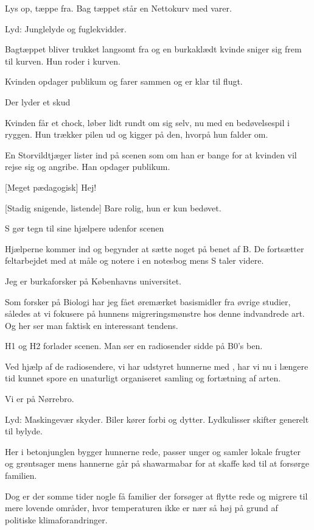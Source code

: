 \documentclass[a4paper,11pt]{article}
\begin{document}
  
\begin{sketch}
\scene Lys op, tæppe fra. Bag tæppet står en Nettokurv med varer.

\scene Lyd: Junglelyde og fuglekvidder.

\scene Bagtæppet bliver trukket langsomt fra og en burkaklædt kvinde sniger sig frem til kurven. Hun roder i kurven.

\scene Kvinden opdager publikum og farer sammen og er klar til flugt.

\scene Der lyder et skud

\scene Kvinden får et chock, løber lidt rundt om sig selv, nu med en bedøvelsespil i ryggen. Hun trækker pilen ud og kigger på den, hvorpå hun falder om.

\scene En Storvildtjæger lister ind på scenen som om han er bange for at kvinden vil rejse sig og angribe. Han opdager publikum.

[Meget pædagogisk] Hej! 

[Stadig snigende, listende] Bare rolig, hun er kun bedøvet. 

\scene S gør tegn til sine hjælpere udenfor scenen

\scene Hjælperne kommer ind og begynder at sætte noget på benet af B. De fortsætter feltarbejdet med at måle og notere i en notesbog mens S taler videre.

 Jeg er burkaforsker på Københavns universitet. 

 Som forsker på Biologi har jeg fået øremærket basismidler fra  øvrige studier, således at vi fokusere på hunnens migreringsmønstre hos denne indvandrede art. Og her ser man faktisk en interessant tendens.

\scene H1 og H2 forlader scenen. Man ser en radiosender sidde på B0's ben.

 Ved hjælp af de radiosendere, vi har udstyret hunnerne med , har vi nu i længere tid kunnet spore en unaturligt organiseret samling og fortætning af arten.

 Vi er på Nørrebro.

\scene Lyd: Maskingevær skyder. Biler kører forbi og dytter. Lydkulisser skifter generelt til bylyde.

 Her i betonjunglen bygger hunnerne rede, passer unger og samler lokale frugter og grøntsager mens hannerne går på shawarmabar for at skaffe kød til at forsørge familien.

 Dog er der somme tider nogle få familier der forsøger at flytte rede og migrere til mere lovende områder, hvor temperaturen ikke er nær så høj på grund af politiske klimaforandringer.


\end{sketch}
\end{document}
